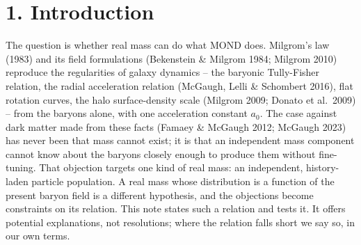 \documentclass[
  10pt,
]{article}
\begin{document}
\section{1. Introduction}\label{introduction}

The question is whether real mass can do what MOND does. Milgrom's law
(1983) and its field formulations (Bekenstein \& Milgrom 1984; Milgrom
2010) reproduce the regularities of galaxy dynamics -- the baryonic
Tully-Fisher relation, the radial acceleration relation (McGaugh, Lelli
\& Schombert 2016), flat rotation curves, the halo surface-density scale
(Milgrom 2009; Donato et al.~2009) -- from the baryons alone, with one
acceleration constant $a_0$. The case against dark matter made from these
facts (Famaey \& McGaugh 2012; McGaugh 2023) has never been that mass
cannot exist; it is that an independent mass component cannot know about
the baryons closely enough to produce them without fine-tuning. That
objection targets one kind of real mass: an independent, history-laden
particle population. A real mass whose distribution is a function of the
present baryon field is a different hypothesis, and the objections
become constraints on its relation. This note states such a relation and tests it. It offers potential explanations, not resolutions; where the relation falls short we say so, in our own terms.
\end{document}
